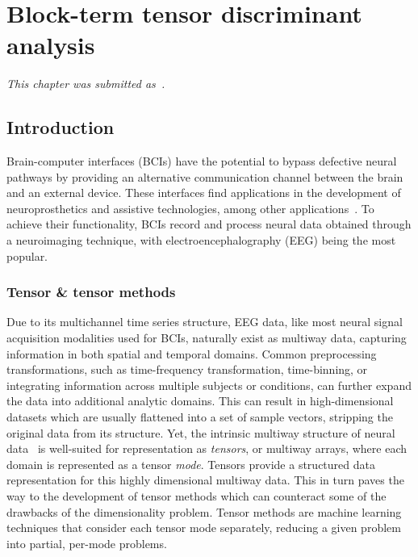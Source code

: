 
\chapter{Block-term tensor discriminant analysis}
\label{sec:bttda}

\emph{This chapter was submitted as~\textcite{VanDenKerchove2024a}.}

\section{Introduction}

Brain-computer interfaces (BCIs) have the potential to bypass
defective neural pathways by providing an alternative communication channel
between the brain and an external device.
These interfaces find applications in the development of neuroprosthetics and assistive
technologies, among other applications~\cite{Wolpaw2020}.
To achieve their functionality, BCIs record and process neural data obtained through
a neuroimaging technique, with electroencephalography (EEG) being the most popular.

\subsection{Tensor \& tensor methods}

Due to its multichannel time series structure, EEG data, like most neural
signal acquisition modalities used for BCIs, naturally exist as multiway data,
capturing information in both spatial and temporal domains.
Common preprocessing transformations, such as time-frequency transformation,
time-binning, or integrating information across multiple subjects or conditions,
can further expand the data into additional analytic domains.
This can result in high-dimensional datasets which are usually flattened into a
set of sample vectors, stripping the original data from its structure.
Yet, the intrinsic multiway structure of neural data~\cite{Erol2022} is
well-suited for representation as \emph{tensors}, or multiway arrays, where
each domain is represented as a tensor \emph{mode}.
Tensors provide a structured data representation for this highly dimensional
multiway data.
This in turn paves the way to the development of tensor methods which can
counteract some of the drawbacks of the dimensionality problem.
Tensor methods are machine learning techniques that consider each tensor mode
separately, reducing a given problem into partial, per-mode problems.

